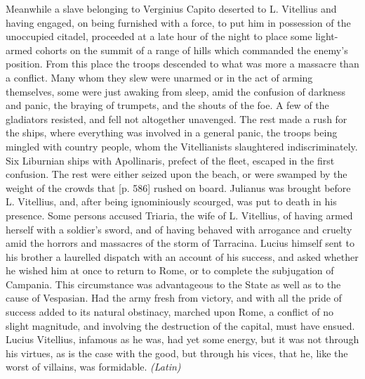 Meanwhile a slave belonging to Verginius Capito deserted to L. Vitellius and having engaged, on being furnished with a force, to put him in possession of the unoccupied citadel, proceeded at a late hour of the night to place some light-armed cohorts on the summit of a range of hills which commanded the enemy's position. From this place the troops descended to what was more a massacre than a conflict. Many whom they slew were unarmed or in the act of arming themselves, some were just awaking from sleep, amid the confusion of darkness and panic, the braying of trumpets, and the shouts of the foe. A few of the gladiators resisted, and fell not altogether unavenged. The rest made a rush for the ships, where everything was involved in a general panic, the troops being mingled with country people, whom the Vitellianists slaughtered indiscriminately. Six Liburnian ships with Apollinaris, prefect of the fleet, escaped in the first confusion. The rest were either seized upon the beach, or were swamped by the weight of the crowds that [p. 586] rushed on board. Julianus was brought before L. Vitellius, and, after being ignominiously scourged, was put to death in his presence. Some persons accused Triaria, the wife of L. Vitellius, of having armed herself with a soldier's sword, and of having behaved with arrogance and cruelty amid the horrors and massacres of the storm of Tarracina. Lucius himself sent to his brother a laurelled dispatch with an account of his success, and asked whether he wished him at once to return to Rome, or to complete the subjugation of Campania. This circumstance was advantageous to the State as well as to the cause of Vespasian. Had the army fresh from victory, and with all the pride of success added to its natural obstinacy, marched upon Rome, a conflict of no slight magnitude, and involving the destruction of the capital, must have ensued. Lucius Vitellius, infamous as he was, had yet some energy, but it was not through his virtues, as is the case with the good, but through his vices, that he, like the worst of villains, was formidable. \emph{(Latin)}


